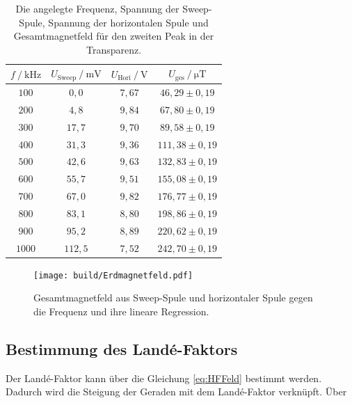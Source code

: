 \begin{table}[H]
    \centering
    \caption{Die angelegte Frequenz, Spannung der Sweep-Spule, Spannung der horizontalen Spule und Gesamtmagnetfeld für den zweiten Peak in der Transparenz.}
    \label{tab:Messung2}
    \begin{tabular}{c c c c}
    \toprule
      $ f \mathbin{/} \unit{\kilo\hertz}$ & $U_{\text{Sweep}} \mathbin{/} \unit{\milli\volt}$ & $U_{\text{Hori}} \mathbin{/} \unit{\volt}$ & $U_{\text{ges}} \mathbin{/} \unit{\micro\tesla}$ \\
    \midrule
        $100$ &     $ 0,0    $    &   $7,67$     &$46,29   \pm 0,19$     \\ 
        $200$ &     $ 4,8  $    &   $9,84$     &$67,80   \pm 0,19$     \\ 
        $300$ &     $ 17,7 $    &   $9,70$     &$89,58   \pm 0,19$    \\ 
        $400$ &     $ 31,3 $    &   $9,36$     &$111,38  \pm 0,19$    \\ 
        $500$ &     $ 42,6 $    &   $9,63$     &$132,83  \pm 0,19$    \\ 
        $600$ &     $ 55,7 $    &   $9,51$     &$155,08  \pm 0,19$    \\ 
        $700$ &     $ 67,0 $    &   $9,82$     &$176,77  \pm 0,19$    \\ 
        $800$ &     $ 83,1 $    &   $8,80$     &$198,86  \pm 0,19$    \\ 
        $900$ &     $ 95,2 $    &   $8,89$     &$220,62  \pm 0,19$    \\ 
        $1000$ &    $ 112,5$    &   $7,52$     &$242,70  \pm 0,19$    \\ 
    \bottomrule
    \end{tabular}
    \end{table}


\begin{figure}[H]
    \centering
    \texttt{[image: build/Erdmagnetfeld.pdf]}
    \caption{Gesamtmagnetfeld aus Sweep-Spule und horizontaler Spule gegen die Frequenz und ihre lineare Regression.}
    \label{fig:Gesamtmagnetfeld}
\end{figure}

\subsection{Bestimmung des Landé-Faktors}

Der Landé-Faktor kann über die Gleichung \eqref{eq:HFFeld} bestimmt werden.
Dadurch wird die Steigung der Geraden mit dem Landé-Faktor verknüpft.
Über

